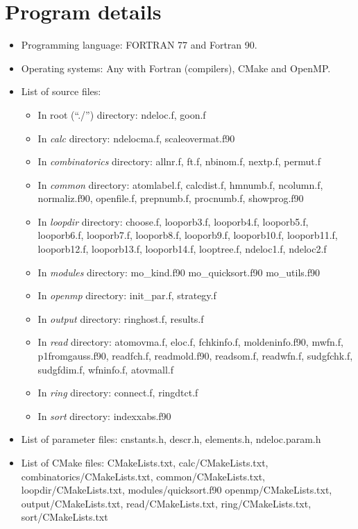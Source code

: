 \documentclass[a4paper,11pt,openany]{memoir}
\begin{document}
\section{Program details}
\begin{itemize}
	\item Programming language: FORTRAN 77 and Fortran 90.
	\item Operating systems: Any with Fortran (compilers), CMake and OpenMP.
	\item List of source files:
			\begin{itemize}
				\item In root (``./'') directory:
					ndeloc.f,
					goon.f
				\item In \emph{calc} directory:
					ndelocma.f,
					scaleovermat.f90
				\item In \emph{combinatorics} directory:
					allnr.f,
					ft.f,
					nbinom.f,
					nextp.f,
					permut.f
				\item In \emph{common} directory:
					atomlabel.f,
					calcdist.f,
					hmnumb.f,
					ncolumn.f,
					normaliz.f90,
					openfile.f,
					prepnumb.f,
					procnumb.f,
					showprog.f90
				\item In \emph{loopdir} directory:
					choose.f,
					looporb3.f,
					looporb4.f,
					looporb5.f,
					looporb6.f,
					looporb7.f,
					looporb8.f,
					looporb9.f,
					looporb10.f,
					looporb11.f,
					looporb12.f,
					looporb13.f,
					looporb14.f,
					looptree.f,
					ndeloc1.f,
					ndeloc2.f
				\item In \emph{modules} directory:
					mo\_kind.f90
					mo\_quicksort.f90
					mo\_utils.f90
				\item In \emph{openmp} directory:
					init\_par.f,
					strategy.f
				\item In \emph{output} directory:
					ringhost.f,
					results.f
				\item In \emph{read} directory:
					atomovma.f,
					eloc.f,
					fchkinfo.f,
					moldeninfo.f90,
					mwfn.f,
					p1fromgauss.f90,
					readfch.f,
					readmold.f90,
					readsom.f,
					readwfn.f,
					sudgfchk.f,
					sudgfdim.f,
					wfninfo.f,
					atovmall.f
				\item In \emph{ring} directory:
					connect.f,
					ringdtct.f
				\item In \emph{sort} directory:
					indexxabs.f90
			\end{itemize}
	\item List of parameter files:
					cnstants.h,
					descr.h,
					elements.h,
					ndeloc.param.h
	\item List of CMake files:
					CMakeLists.txt,
					calc/CMakeLists.txt,
					combinatorics/CMakeLists.txt,
					common/CMakeLists.txt,
					loopdir/CMakeLists.txt,
					modules/quicksort.f90
					openmp/CMakeLists.txt,
					output/CMakeLists.txt,
					read/CMakeLists.txt,
					ring/CMakeLists.txt,
					sort/CMakeLists.txt
\end{itemize}
\end{document}
